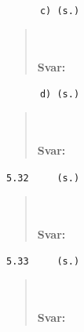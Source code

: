 \documentclass[a4paper]{article}
\newcommand{\tskcol}[1]{\textcolor{tskcol}{#1}}
\begin{document}
	\texttt{\tskcol{~~~~~~c) (s.)}}
	\begin{quotation}
		\noindent
		\\ \\
		\textbf{Svar:}
	\end{quotation}
	
	\texttt{\tskcol{~~~~~~d) (s.)}}
	\begin{quotation}
		\noindent
		\\ \\
		\textbf{Svar:}
	\end{quotation}
	
	\texttt{\tskcol{5.32~~~~ (s.)}}
	\begin{quotation}
		\noindent
		\\ \\
		\textbf{Svar:}
	\end{quotation}
	
	\texttt{\tskcol{5.33~~~~ (s.)}}
	\begin{quotation}
		\noindent
		\\ \\
		\textbf{Svar:}
	\end{quotation}
\end{document}
